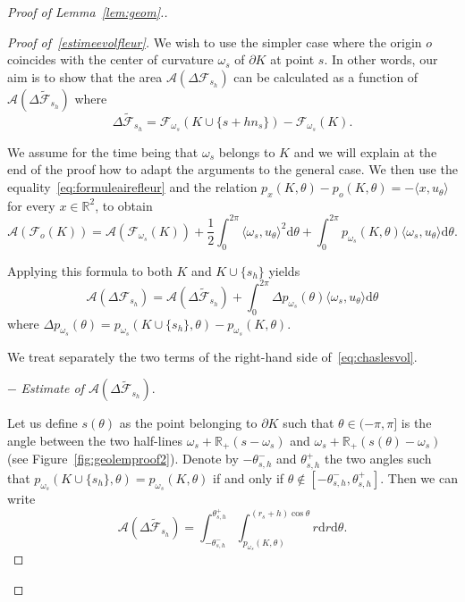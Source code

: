 \documentclass[AHL,Unicode,longabstracts,published]{cedram}
\newcommand{\cA}{\mathcal{A}}
\newcommand{\cF}{\mathcal{F}}
\newcommand{\dd}{\mathrm{d}}
\newcommand{\R}{\mathbb{R}}
\newcommand{\pass}{\vspace{0.3cm}\noindent}
\newcommand{\noi}{\noindent}
\newenvironment*{prooff}{\begin{proof}}{\let\qed\relax\end{proof}}
\newcommand{\R}{\mathbb{R}}
\begin{document}
\begin{proof}[{Proof of Lemma~\ref{lem:geom}.}]
\begin{prooff}[{Proof of~\eqref{estimeevolfleur}}]
We wish to use the simpler case where the origin $o$ coincides with the center of curvature $\omega_s$ of $\partial K$ at point $s$. In other words, our aim is to show that the area $\cA(\Delta\cF_{s_h})$ can be calculated as a function of $\cA(\Delta\widetilde{\cF}_{s_h})$ where
\[
\Delta\widetilde{\cF}_{s_h}=\cF_{\omega_s}(K \cup \{s+h n_s\})-\cF_{\omega_s}(K).
\]

We assume for the time being that $\omega_s$ belongs to $K$ and we will explain at the end of the proof how to adapt the arguments to the general case. We then use the equality~\eqref{eq:formuleairefleur} and the relation $p_x(K,\theta) -p_o(K,\theta) = -\langle x, u_{\theta}\rangle$ for every $x\in\R^2$, to obtain
\begin{equation}\label{eq:eqsuppl}
\cA(\cF_o(K)) =
\cA(\cF_{\omega_s}(K)) +\frac1{2}\int_0^{2\pi}\langle \omega_s, u_{\theta}\rangle^2\dd \theta+\int_0^{2\pi}p_{\omega_s}(K,\theta)\langle \omega_s, u_{\theta}\rangle\dd \theta.
\end{equation}

Applying this formula to both $K$ and $K\cup\{s_h\}$ yields
\begin{equation}\label{eq:chaslesvol}
\cA(\Delta\cF_{s_h})=\cA(\Delta\widetilde{\cF}_{s_h}) + \int_0^{2\pi} \Delta p_{\omega_s}(\theta)\langle \omega_s, u_{\theta}\rangle\dd\theta
\end{equation}
where $\Delta p_{\omega_s}(\theta)=p_{\omega_s}(K \cup \{s_h\},\theta)-p_{\omega_s}(K, \theta)$.

 We treat separately the two terms of the right-hand side of~\eqref{eq:chaslesvol}.

$-$ \emph{Estimate of $\cA(\Delta\widetilde{\cF}_{s_h})$}.

Let us define $s(\theta)$ as the point belonging to $\partial K$ such that $\theta \in(-\pi,\pi]$ is the angle between the two half-lines $\omega_s+\R_+(s-\omega_s)$ and $\omega_s+\R_+(s(\theta)-\omega_s)$ (see Figure~\ref{fig:geolemproof2}). Denote by $-\theta_{s,h}^-$ and $\theta_{s,h}^+$ the two angles such that $p_{\omega_s}(K\cup\{s_h\},\theta) = p_{\omega_s}(K,\theta)$ if and only if $\theta\notin[-\theta_{s,h}^-,\theta_{s,h}^+]$. Then we can write
\begin{equation}\label{eq:voldifflow1}
\cA(\Delta\widetilde{\cF}_{s_h})= \int_{-\theta_{s,h}^-}^{\theta_{s,h}^+}\int_{p_{\omega_s}(K,\theta)}^{(r_s+h)\cos\theta} r \dd r \dd\theta.
\end{equation}


\end{prooff}
\end{proof}
\end{document}
